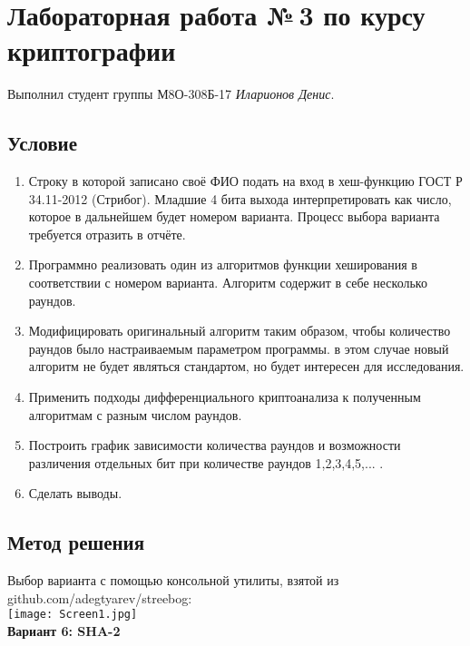 \documentclass[12pt]{article}
\begin{document}
\section*{Лабораторная работа №\,3 по курсу криптографии}

Выполнил студент группы М8О-308Б-17 \textit{Иларионов Денис}.

\subsection*{Условие}
\begin{enumerate}
\item Строку в которой записано своё ФИО подать на вход в хеш-функцию ГОСТ Р 34.11-2012 (Стрибог). Младшие 4 бита выхода интерпретировать как число, которое в дальнейшем будет номером варианта. Процесс выбора варианта требуется отразить в отчёте.
\item Программно реализовать один из алгоритмов функции хеширования в соответствии с номером варианта. Алгоритм содержит в себе несколько раундов.
\item Модифицировать оригинальный алгоритм таким образом, чтобы количество раундов было настраиваемым параметром программы. в этом случае новый алгоритм не будет являться стандартом, но будет интересен для исследования.
\item Применить подходы дифференциального криптоанализа к полученным алгоритмам с разным числом раундов.
\item Построить график зависимости количества раундов и возможности различения отдельных бит при количестве раундов 1,2,3,4,5,... .
\item Сделать выводы.
\end{enumerate}

\subsection*{Метод решения}
Выбор варианта с помощью консольной утилиты, взятой из github.com/adegtyarev/streebog:\\
\texttt{[image: Screen1.jpg]}\\

\textbf{Вариант 6: SHA-2}
\end{document}
